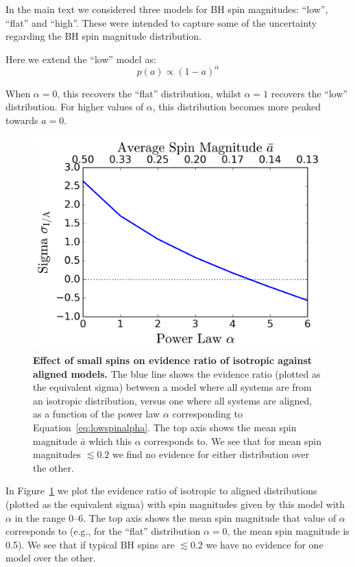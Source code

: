 \documentclass{nature}
\begin{document}
\begin{methods}
In the main text we considered three models for BH spin magnitudes:
``low'', ``flat'' and ``high''. These were intended to capture some of
the uncertainty regarding the BH spin magnitude distribution.

Here we extend the ``low'' model as:
%
\begin{equation}
p(a) \propto (1 - a)^{\alpha}
\label{eq:lowspinalpha}
\end{equation}
%

When $\alpha = 0$, this recovers the ``flat'' distribution, whilst
$\alpha = 1$ recovers the ``low'' distribution. For higher values of
$\alpha$, this distribution becomes more peaked towards
$a = 0$.

%
\begin{figure}
\centering
\includegraphics[width=\textwidth]{../plots/sigma_v_alpha.png}
\caption{\textbf{Effect of small spins on evidence ratio of isotropic against
  aligned models.} The blue line shows the evidence ratio
  (plotted as the equivalent sigma) between a model where all systems
  are from an isotropic distribution, versus one where all systems are
  aligned, as a function of the power law $\alpha$ corresponding
  to Equation~\ref{eq:lowspinalpha}.  The top axis shows the mean spin
  magnitude $\bar{a}$ which this $\alpha$ corresponds to. We see that
  for mean spin magnitudes $\lesssim 0.2$ we find no evidence for
  either distribution over the other.}
\label{fig:smallspinsalpha}
\end{figure}
%

In Figure~\ref{fig:smallspinsalpha} we plot the evidence ratio of
isotropic to aligned distributions (plotted as the equivalent sigma)
with spin magnitudes given by this model with $\alpha$ in the range
$0$--$6$. The top axis shows the mean spin magnitude that value of
$\alpha$ corresponds to (e.g., for the ``flat'' distribution
$\alpha = 0$, the mean spin magnitude is 0.5). We see that if typical
BH spins are $\lesssim 0.2$ we have no evidence for one model over the
other.


\end{methods}
\end{document}
